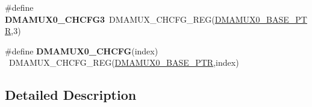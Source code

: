 \begin{DoxyCompactItemize}
\item 
\hypertarget{group___d_m_a_m_u_x___register___accessor___macros_ga91901af15d28d4df4369689afa83ed91}{}\#define {\bfseries D\+M\+A\+M\+U\+X0\+\_\+\+C\+H\+C\+F\+G3}~D\+M\+A\+M\+U\+X\+\_\+\+C\+H\+C\+F\+G\+\_\+\+R\+E\+G(\hyperlink{group___d_m_a_m_u_x___peripheral_ga403b61d306820e4e1113c636300004a3}{D\+M\+A\+M\+U\+X0\+\_\+\+B\+A\+S\+E\+\_\+\+P\+T\+R},3)\label{group___d_m_a_m_u_x___register___accessor___macros_ga91901af15d28d4df4369689afa83ed91}

\item 
\hypertarget{group___d_m_a_m_u_x___register___accessor___macros_ga0e81bfe2cfefc7729dab0f2f979f4afd}{}\#define {\bfseries D\+M\+A\+M\+U\+X0\+\_\+\+C\+H\+C\+F\+G}(index)                                      ~D\+M\+A\+M\+U\+X\+\_\+\+C\+H\+C\+F\+G\+\_\+\+R\+E\+G(\hyperlink{group___d_m_a_m_u_x___peripheral_ga403b61d306820e4e1113c636300004a3}{D\+M\+A\+M\+U\+X0\+\_\+\+B\+A\+S\+E\+\_\+\+P\+T\+R},index)\label{group___d_m_a_m_u_x___register___accessor___macros_ga0e81bfe2cfefc7729dab0f2f979f4afd}

\end{DoxyCompactItemize}


\subsection{Detailed Description}
